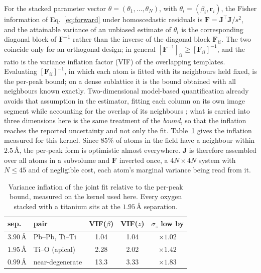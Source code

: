 \documentclass[aps,prb,twocolumn,superscriptaddress,floatfix,nofootinbib]{revtex4-2}
\begin{document}
For the stacked parameter vector $\theta=(\theta_1,\dots,\theta_N)$, with $\theta_i=(\beta_i,\mathbf{r}_i)$, the Fisher information of Eq.~\eqref{eq:forward} under homoscedastic residuals is $\mathbf{F}=\mathbf{J}^{\!\top}\mathbf{J}/s^2$, and the attainable variance of an unbiased estimate of $\theta_i$ is the corresponding diagonal block of $\mathbf{F}^{-1}$ rather than the inverse of the diagonal block $\mathbf{F}_{ii}$. The two coincide only for an orthogonal design; in general $[\mathbf{F}^{-1}]_{ii}\ge[\mathbf{F}_{ii}]^{-1}$, and the ratio is the variance inflation factor (VIF) of the overlapping templates. Evaluating $[\mathbf{F}_{ii}]^{-1}$, in which each atom is fitted with its neighbours held fixed, is the per-peak bound; on a dense sublattice it is the bound obtained with all neighbours known exactly. Two-dimensional model-based quantification already avoids that assumption in the estimator, fitting each column on its own image segment while accounting for the overlap of its neighbours \citep{DeBacker2016}; what is carried into three dimensions here is the same treatment of the \emph{bound}, so that the inflation reaches the reported uncertainty and not only the fit. Table~\ref{tab:vif} gives the inflation measured for this kernel. Since $85\%$ of atoms in the field have a neighbour within $2.5$\,\AA, the per-peak form is optimistic almost everywhere. $\mathbf{J}$ is therefore assembled over all atoms in a subvolume and $\mathbf{F}$ inverted once, a $4N\times4N$ system with $N\le45$ and of negligible cost, each atom's marginal variance being read from it.

\begin{table}[t]
  \centering \small
  \begin{tabular}{@{}llccc@{}}
    \toprule
    sep. & pair & VIF($\beta$) & VIF($z$) & $\sigma_z$ low by \\
    \midrule
    $3.90$\,\AA & Pb--Pb, Ti--Ti  & \phantom{0}1.04 & 1.04 & $\times1.02$ \\
    $1.95$\,\AA & Ti--O (apical)  & \phantom{0}2.28 & 2.02 & $\times1.42$ \\
    $0.99$\,\AA & near-degenerate & 13.3 & 3.33 & $\times1.83$ \\
    \bottomrule
  \end{tabular}
  \caption{Variance inflation of the joint fit relative to the per-peak bound, measured on the
    kernel used here. Every oxygen stacked with a titanium sits at the $1.95$\,\AA{} separation.}
  \label{tab:vif}
\end{table}
\end{document}
